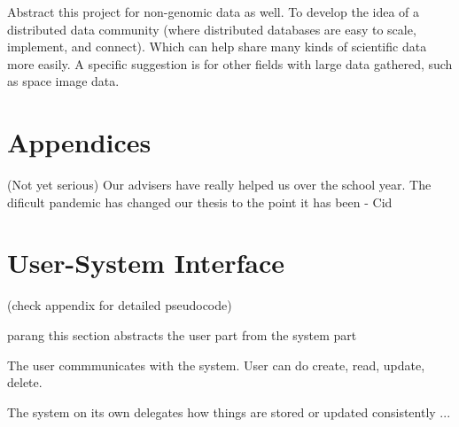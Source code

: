 \documentclass[acmsmall]{acmart}
\begin{document}
Abstract this project for non-genomic data as well. To develop the idea of a distributed data community (where distributed databases are easy to scale, implement, and connect). Which can help share many kinds of scientific data more easily. A specific suggestion is for other fields with large data gathered, such as space image data.


\section{Appendices}

\begin{acks}

(Not yet serious) Our advisers have really helped us over the school year. The dificult pandemic has changed our thesis to the point it has been - Cid
\end{acks}




\appendix

\section{User-System Interface}
(check appendix for detailed pseudocode)

parang this section abstracts the user part from the system part

The user commmunicates with the system. User can do create, read, update, delete.

The system on its own delegates how things are stored or updated consistently ...
\end{document}
